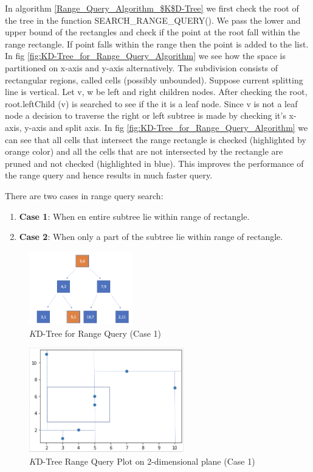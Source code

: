 In algorithm \ref{Range_Query_Algorithm_$K$D-Tree} we first check the root of the tree in the function SEARCH\_RANGE\_QUERY(). We pass the lower and upper bound of the rectangles and check if the point at the root fall within the range rectangle. If point falls within the range then the point is added to the list.
In fig \ref{fig:KD-Tree_for_Range_Query_Algorithm} we see how the space is partitioned on x-axis and y-axis alternatively. The subdivision consists of rectangular regions, called cells (possibly unbounded). Suppose current splitting line is vertical. Let v, w be left and right children nodes. After checking the root, root.leftChild (v) is searched to see if the it is a leaf node. Since v is not a leaf node a decision to traverse the right or left subtree is made by checking it's x-axis, y-axis and split axis. In  fig \ref{fig:KD-Tree_for_Range_Query_Algorithm} we can see that all cells that intersect the range rectangle is checked (highlighted by orange color) and all the cells that are not intersected by the rectangle are pruned and not checked (highlighted in blue). This improves the performance of the range query and hence results in much faster query.


There are two cases in range query search:
\begin{enumerate}
    \item\textbf{Case 1}: When en entire subtree lie within range of rectangle.
    \item\textbf{Case 2}: When only a part of the subtree lie within range of rectangle.
\end{enumerate}

\begin{figure}[htp]
    \centering
    \includegraphics[width=0.4\textwidth]{graphs/Range_Query_Tree.png}
    \caption{$K$D-Tree for Range Query (Case 1)}
    \label{fig:KD-Tree_for_Range Query}
\end{figure}


\begin{figure}[htp]
    \centering
    \includegraphics[width=0.6\textwidth]{graphs/Range_Query_plot.png}
    \caption{$K$D-Tree Range Query Plot on 2-dimensional plane (Case 1)}
    \label{fig:KD_Tree_Range_Query_Plot}
\end{figure}


